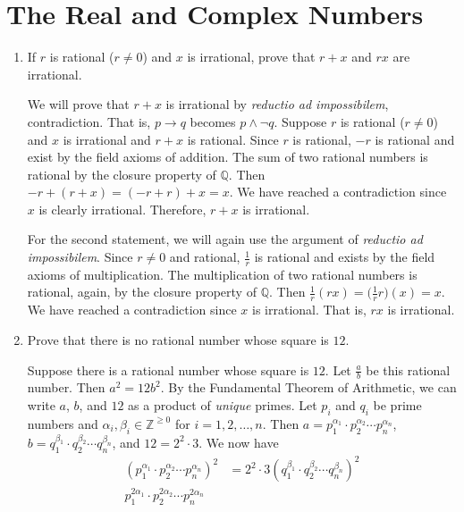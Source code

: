 \section{The Real and Complex Numbers}

\begin{enumerate}
\item
  If \(r\) is rational (\(r\neq 0\)) and \(x\) is irrational, prove that
  \(r + x\) and \(rx\) are irrational.
  \par\smallskip
  We will prove that \(r + x\) is irrational by
  \textit{reductio ad impossibilem}, contradiction.
  That is, \(p\to q\) becomes \(p\wedge\neg q\).
  Suppose \(r\) is rational (\(r\neq 0\)) and \(x\) is irrational and
  \(r + x\) is rational.
  Since \(r\) is rational, \(-r\) is rational and exist by the field axioms of
  addition.
  The sum of two rational numbers is rational by the closure property of
  \(\mathbb{Q}\).
  Then \(-r + (r + x) = (-r + r) + x = x\).
  We have reached a contradiction since \(x\) is clearly irrational.
  Therefore, \(r + x\) is irrational.
  \par\smallskip
  For the second statement, we will again use the argument of
  \textit{reductio ad impossibilem}.
  Since \(r\neq 0\) and rational, \(\frac{1}{r}\) is rational and exists by the
  field axioms of multiplication.
  The multiplication of two rational numbers is rational, again, by the
  closure property of \(\mathbb{Q}\).
  Then \(\frac{1}{r}(rx) = \bigl(\frac{1}{r}r\bigr)(x) = x\).
  We have reached a contradiction since \(x\) is irrational.
  That is, \(rx\) is irrational.
\item
  Prove that there is no rational number whose square is \(12\).
  \par\smallskip
  Suppose there is a rational number whose square is \(12\).
  Let \(\frac{a}{b}\) be this rational number.
  Then \(a^2 = 12b^2\).
  By the Fundamental Theorem of Arithmetic, we can write \(a\), \(b\), and
  \(12\) as a product of \textit{unique} primes.
  Let \(p_i\) and \(q_i\) be prime numbers and
  \(\alpha_i, \beta_i\in\mathbb{Z}^{\geq 0}\) for \(i = 1, 2, \ldots, n\).
  Then \(a = p_1^{\alpha_1}\cdot p_2^{\alpha_2}\cdots p_n^{\alpha_n}\),
  \(b = q_1^{\beta_1}\cdot q_2^{\beta_2}\cdots q_n^{\beta_n}\), and
  \(12 = 2^2\cdot 3\).
  We now have
  \begin{align*}
    (p_1^{\alpha_1}\cdot p_2^{\alpha_2}\cdots p_n^{\alpha_n})^2
    &= 2^2\cdot 3(q_1^{\beta_1}\cdot q_2^{\beta_2}\cdots q_n^{\beta_n})^2\\
    p_1^{2\alpha_1}\cdot p_2^{2\alpha_2}\cdots p_n^{2\alpha_n}

\end{align*}
\end{enumerate}
